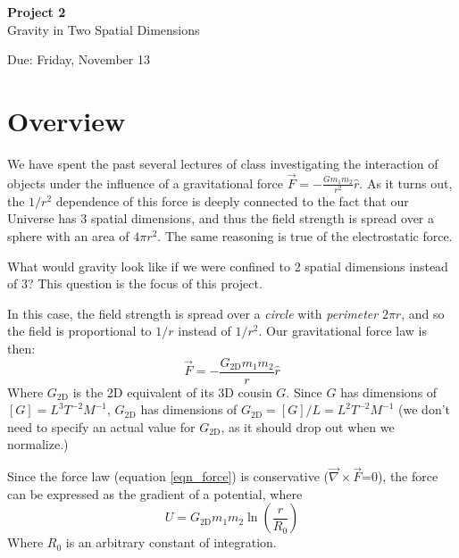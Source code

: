 \documentclass{article}
\begin{document}
\fancyfoot[C]{\thepage}
\vspace*{0cm}
\begin{center}
	{\LARGE \textbf{Project 2}}\\
	\vspace{0.25cm}
	{\Large Gravity in Two Spatial Dimensions}
	
	{\Large Due: Friday, November 13}
\end{center}

\newcommand{\textbook}{\textit{Giordano}}

\section*{Overview}
We have spent the past several lectures of class investigating the interaction of objects under the influence of a gravitational force $\vec{F}=-\frac{Gm_1m_2}{r^2}\hat{r}$. As it turns out, the $1/r^2$ dependence of this force is deeply connected to the fact that our Universe has 3 spatial dimensions, and thus the field strength is spread over a sphere with an area of $4\pi r^2$. The same reasoning is true of the electrostatic force.

What would gravity look like if we were confined to 2 spatial dimensions instead of 3? This question is the focus of this project.

 In this case, the field strength is spread over a \textit{circle} with \textit{perimeter} $2\pi r$, and so the field is proportional to $1/r$ instead of $1/r^2$. Our gravitational force law is then:
 \begin{equation}
 	\label{eqn_force}
	 \vec{F}=-\frac{G_\mathrm{2D}m_1m_2}{r}\hat{r}
 \end{equation}
 Where $G_\mathrm{2D}$ is the 2D equivalent of its 3D cousin $G$. Since $G$ has dimensions of $[G]=L^3T^{-2}M^{-1}$, $G_\mathrm{2D}$ has dimensions of $G_\mathrm{2D}=[G]/L=L^2T^{-2}M^{-1}$ (we don't need to specify an actual value for $G_\mathrm{2D}$, as it should drop out when we normalize.)
 
 Since the force law (equation \ref{eqn_force}) is conservative ($\vec{\nabla}\times\vec{F}$=0), the force can be expressed as the gradient of a potential, where 
 \begin{equation}
	 U=G_\mathrm{2D}m_1m_2\ln\left(\frac{r}{R_0}\right)
 \end{equation}
Where $R_0$ is an arbitrary constant of integration.
\end{document}

